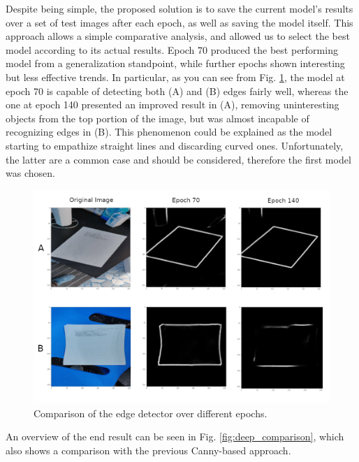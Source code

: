 \documentclass[a4paper]{article}
\begin{document}
Despite being simple, the proposed solution is to save the current model's results over a set of test images after each epoch, as well as saving the model itself. This approach allows a simple comparative analysis, and allowed us to select the best model according to its actual results. Epoch 70 produced the best performing model from a generalization standpoint, while further epochs shown interesting but less effective trends. In particular, as you can see from Fig. \ref{fig:edge_comparison_epoch}, the model at epoch 70 is capable of detecting both (A) and (B) edges fairly well, whereas the one at epoch 140 presented an improved result in (A), removing uninteresting objects from the top portion of the image, but was almost incapable of recognizing edges in (B). This phenomenon could be explained as the model starting to empathize straight lines and discarding curved ones. Unfortunately, the latter are a common case and should be considered, therefore the first model was chosen.

\begin{figure}[htb!]
	\centering
	\includegraphics[width=\linewidth]{edge_comparison_epoch.png}
	\caption{Comparison of the edge detector over different epochs.}
	\label{fig:edge_comparison_epoch}
\end{figure}


An overview of the end result can be seen in Fig. \ref{fig:deep_comparison}, which also shows a comparison with the previous Canny-based approach.
\end{document}
